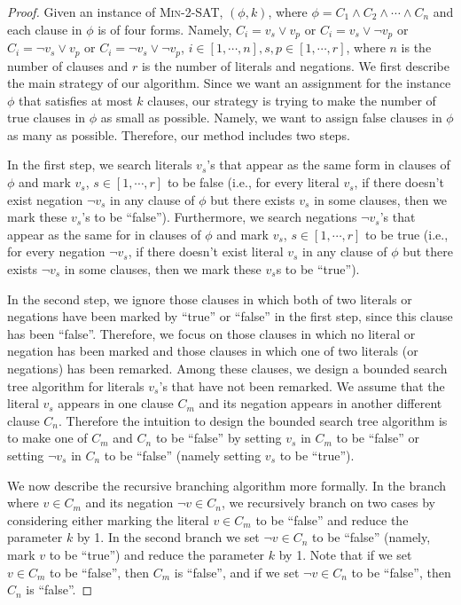 \documentclass{article}
\newcommand{\pname}[1]{\textnormal{\textsc{#1}}}
\begin{document}
\begin{proof}
Given an instance of \pname{Min-2-SAT}, \((\phi, k)\), where \(\phi=C_1 \land C_2 \land \cdots \land C_n\) and each clause in \(\phi\) is of four forms. Namely, \(C_i = v_s \lor v_p\) or \(C_i = v_s \lor \neg v_p\) or \(C_i = \neg v_s \lor v_p\) or \(C_i = \neg v_s \lor \neg v_p\), \(i \in [1,\cdots,n], s,p \in [1,\cdots,r]\), where \(n\) is the number of clauses and \(r\) is the number of literals and negations. We first describe the main strategy of our algorithm. Since we want an assignment for the instance \(\phi\) that satisfies at most \(k\) clauses, our strategy is trying to make the number of true clauses in \(\phi\) as small as possible. Namely, we want to assign false clauses in \(\phi\) as many as possible. Therefore, our method includes two steps.

In the first step, we search literals \(v_s\)'s that appear as the same form in clauses of \(\phi\) and mark \(v_s\), \(s \in [1,\cdots, r]\) to be false (i.e., for every literal \(v_s\), if there doesn't exist negation \(\neg v_s\) in any clause of \(\phi\) but there exists \(v_s\) in some clauses, then we mark these \(v_s\)'s to be ``false''). Furthermore, we search negations \(\neg v_s\)'s that appear as the same for in clauses of \(\phi\) and mark \(v_s\), \(s \in [1,\cdots,r]\) to be true (i.e., for every negation \(\neg v_s\), if there doesn't exist literal \(v_s\) in any clause of \(\phi\) but there exists \(\neg v_s\) in some clauses, then we mark these \(v_s\)s to be ``true''). 

In the second step, we ignore those clauses in which both of two literals or negations have been marked by ``true'' or ``false'' in the first step, since this clause has been ``false''. Therefore, we focus on those clauses in which no literal or negation has been marked and those clauses in which one of two literals (or negations) has been remarked. Among these clauses, we design a bounded search tree algorithm for literals \(v_s\)'s that have not been remarked. We assume that the literal \(v_s\) appears in one clause \(C_m\) and its negation appears in another different clause \(C_n\). Therefore the intuition to design the bounded search tree algorithm is to make one of \(C_m\) and \(C_n\) to be ``false'' by setting \(v_s\) in \(C_m\) to be ``false'' or setting \(\neg v_s\) in \(C_n\) to be ``false'' (namely setting \(v_s\) to be ``true'').

We now describe the recursive branching algorithm more formally. In the branch where \(v \in C_m\) and its negation \(\neg v \in C_n\), we recursively branch on two cases by considering either marking the literal \(v \in C_m\) to be ``false'' and reduce the parameter \(k\) by 1. In the second branch we set \(\neg v \in C_n\) to be ``false'' (namely, mark \(v\) to be ``true'') and reduce the parameter \(k\) by 1. Note that if we set \(v \in C_m\) to be ``false'', then \(C_m\) is ``false'', and if we set \(\neg v \in C_n\) to be ``false'', then \(C_n\) is ``false''. 


\end{proof}
\end{document}
